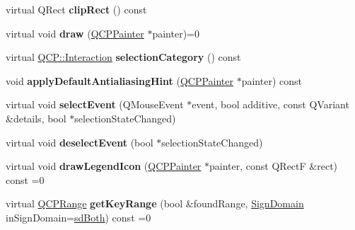 \begin{DoxyCompactItemize}
\item 
\hypertarget{classQCPAbstractPlottable_ac01960b0827913922f5364d559c124ed}{virtual \-Q\-Rect {\bfseries clip\-Rect} () const }\label{classQCPAbstractPlottable_ac01960b0827913922f5364d559c124ed}

\item 
\hypertarget{classQCPAbstractPlottable_acbab5e30dcd04fd302b4a5902ac2c482}{virtual void {\bfseries draw} (\hyperlink{classQCPPainter}{\-Q\-C\-P\-Painter} $\ast$painter)=0}\label{classQCPAbstractPlottable_acbab5e30dcd04fd302b4a5902ac2c482}

\item 
\hypertarget{classQCPAbstractPlottable_a5eef607bcc2aee8bfe2380a8710f6c64}{virtual \hyperlink{namespaceQCP_a2ad6bb6281c7c2d593d4277b44c2b037}{\-Q\-C\-P\-::\-Interaction} {\bfseries selection\-Category} () const }\label{classQCPAbstractPlottable_a5eef607bcc2aee8bfe2380a8710f6c64}

\item 
\hypertarget{classQCPAbstractPlottable_a76e9d6cc7972dc1528f526d163766aca}{void {\bfseries apply\-Default\-Antialiasing\-Hint} (\hyperlink{classQCPPainter}{\-Q\-C\-P\-Painter} $\ast$painter) const }\label{classQCPAbstractPlottable_a76e9d6cc7972dc1528f526d163766aca}

\item 
\hypertarget{classQCPAbstractPlottable_a16aaad02456aa23a759efd1ac90c79bf}{virtual void {\bfseries select\-Event} (\-Q\-Mouse\-Event $\ast$event, bool additive, const \-Q\-Variant \&details, bool $\ast$selection\-State\-Changed)}\label{classQCPAbstractPlottable_a16aaad02456aa23a759efd1ac90c79bf}

\item 
\hypertarget{classQCPAbstractPlottable_a6fa0d0f95560ea8b01ee13f296dab2b1}{virtual void {\bfseries deselect\-Event} (bool $\ast$selection\-State\-Changed)}\label{classQCPAbstractPlottable_a6fa0d0f95560ea8b01ee13f296dab2b1}

\item 
\hypertarget{classQCPAbstractPlottable_a9a450783fd9ed539e589999fd390cdf7}{virtual void {\bfseries draw\-Legend\-Icon} (\hyperlink{classQCPPainter}{\-Q\-C\-P\-Painter} $\ast$painter, const \-Q\-Rect\-F \&rect) const =0}\label{classQCPAbstractPlottable_a9a450783fd9ed539e589999fd390cdf7}

\item 
\hypertarget{classQCPAbstractPlottable_a345d702b2e7e12c8cfdddff65ba85e8c}{virtual \hyperlink{classQCPRange}{\-Q\-C\-P\-Range} {\bfseries get\-Key\-Range} (bool \&found\-Range, \hyperlink{classQCPAbstractPlottable_a661743478a1d3c09d28ec2711d7653d8}{\-Sign\-Domain} in\-Sign\-Domain=\hyperlink{classQCPAbstractPlottable_a661743478a1d3c09d28ec2711d7653d8a082b98cfb91a7363a3b5cd17b0c1cd60}{sd\-Both}) const =0}\label{classQCPAbstractPlottable_a345d702b2e7e12c8cfdddff65ba85e8c}


\end{DoxyCompactItemize}
